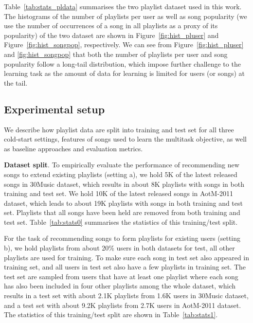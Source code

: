 Table~\ref{tab:stats_pldata} summarises the two playlist dataset used in this work.
The histograms of the number of playlists per user as well as song popularity 
(\ie we use the number of occurrences of a song in all playlists as a proxy of its popularity)
of the two dataset are shown in Figure~\ref{fig:hist_pluser} and Figure~\ref{fig:hist_songpop},
respectively.
We can see from Figure~\ref{fig:hist_pluser} and \ref{fig:hist_songpop} that both the number
of playlists per user and song popularity follow a long-tail distribution, which impose further challenge to the learning task as the amount
of data for learning is limited for users (or songs) at the tail.






\subsection{Experimental setup}

We describe how playlist data are split into training and test set for all three cold-start settings,
features of songs used to learn the multitask objective, as well as baseline approaches and evaluation metrics.

{\bf Dataset split}.
To empirically evaluate the performance of recommending new songs to extend existing playlists (setting a),
we hold 5K of the latest released songs in 30Music dataset, which results in about 8K playlists with songs
in both training and test set.
We hold 10K of the latest released songs in AotM-2011 dataset, which leads to about 19K playlists with songs
in both training and test set.
Playlists that all songs have been held are removed from both training and test set.
Table~\ref{tab:stats0} summarises the statistics of this training/test split.

For the task of recommending songs to form playlists for existing users (setting b),
we hold playlists from about 20\% users in both datasets for test, all other playlists are used for training.
To make sure each song in test set also appeared in training set,
and all users in test set also have a few playlists in training set.
The test set are sampled from users that have at least one playlist where each song has also been
included in four other playlists among the whole dataset,
which results in a test set with about 2.1K playlists from 1.6K users in 30Music dataset,
and a test set with about 9.2K playlists from 2.7K users in AotM-2011 dataset.
The statistics of this training/test split are shown in Table~\ref{tab:stats1}.

